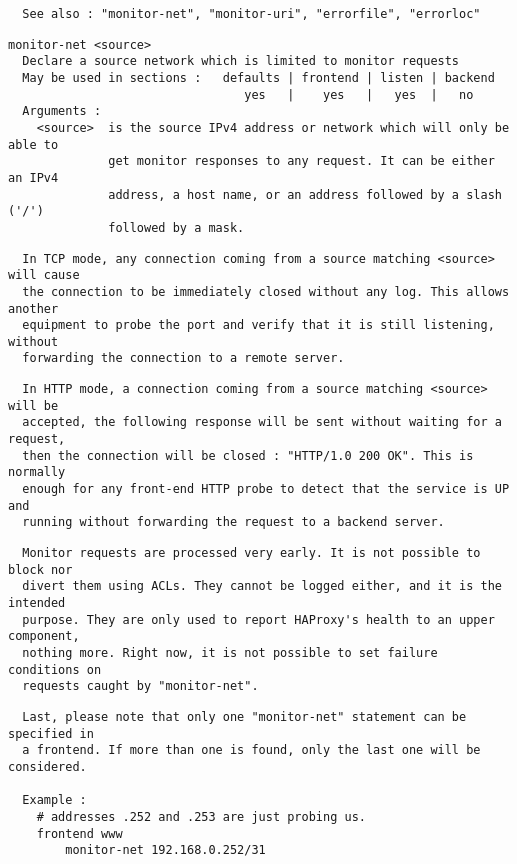 \begin{verbatim}
  See also : "monitor-net", "monitor-uri", "errorfile", "errorloc"
\end{verbatim}

\begin{verbatim}
monitor-net <source>
  Declare a source network which is limited to monitor requests
  May be used in sections :   defaults | frontend | listen | backend
                                 yes   |    yes   |   yes  |   no
  Arguments :
    <source>  is the source IPv4 address or network which will only be able to
              get monitor responses to any request. It can be either an IPv4
              address, a host name, or an address followed by a slash ('/')
              followed by a mask.
\end{verbatim}

\begin{verbatim}
  In TCP mode, any connection coming from a source matching <source> will cause
  the connection to be immediately closed without any log. This allows another
  equipment to probe the port and verify that it is still listening, without
  forwarding the connection to a remote server.
\end{verbatim}

\begin{verbatim}
  In HTTP mode, a connection coming from a source matching <source> will be
  accepted, the following response will be sent without waiting for a request,
  then the connection will be closed : "HTTP/1.0 200 OK". This is normally
  enough for any front-end HTTP probe to detect that the service is UP and
  running without forwarding the request to a backend server.
\end{verbatim}

\begin{verbatim}
  Monitor requests are processed very early. It is not possible to block nor
  divert them using ACLs. They cannot be logged either, and it is the intended
  purpose. They are only used to report HAProxy's health to an upper component,
  nothing more. Right now, it is not possible to set failure conditions on
  requests caught by "monitor-net".
\end{verbatim}

\begin{verbatim}
  Last, please note that only one "monitor-net" statement can be specified in
  a frontend. If more than one is found, only the last one will be considered.
 
  Example :
    # addresses .252 and .253 are just probing us.
    frontend www
        monitor-net 192.168.0.252/31
\end{verbatim}

